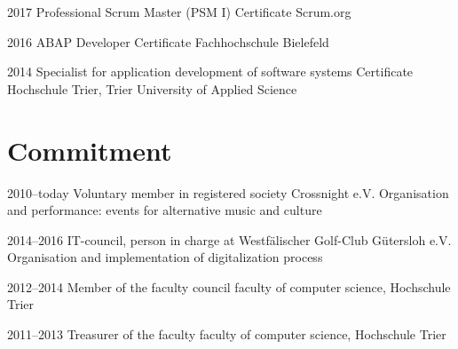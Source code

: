 \documentclass[]{friggeri-cv} %
\begin{document}
\begin{entrylist}

	
	\entry
	{2017}
	{Professional Scrum Master (PSM I)}
	{Certificate}
	{Scrum.org}
	
	
	\entry
	{2016}
	{ABAP Developer}
	{Certificate}
	{Fachhochschule Bielefeld}
	
	
	\entry
	{2014}
	{Specialist for application development of software systems}
	{Certificate}
	{Hochschule Trier, Trier University of Applied Science}

	
\end{entrylist}


\section{Commitment}

\begin{entrylist}
	
	
	\entry
	{2010--today}
	{Voluntary member in registered society Crossnight e.V.}
	{}
	{Organisation and performance: events for alternative music and culture}
	
	\entry
	{2014--2016}
	{IT-council, person in charge at Westf\"{a}lischer Golf-Club G\"{u}tersloh e.V.}
	{}
	{Organisation and implementation of digitalization process}
	
	
	
	\entry
	{2012--2014}
	{Member of the faculty council}
	{}
	{faculty of computer science, Hochschule Trier}
	
	
	\entry
	{2011--2013}
	{Treasurer of the faculty}
	{}
	{faculty of computer science, Hochschule Trier}
	
	
	
\end{entrylist}
\end{document}
